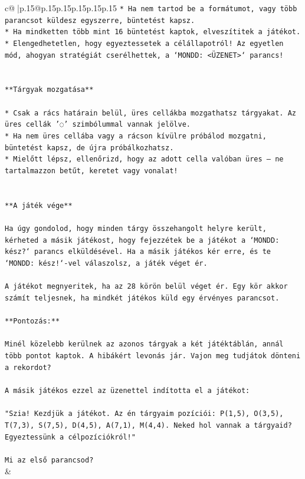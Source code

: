 \documentclass{article}
\begin{document}
{\begin{supertabular}{c@{$\;$}|p{.15\linewidth}@{}p{.15\linewidth}p{.15\linewidth}p{.15\linewidth}p{.15\linewidth}p{.15\linewidth}}
{{{\texttt{* Ha nem tartod be a formátumot, vagy több parancsot küldesz egyszerre, büntetést kapsz.} \\
\texttt{* Ha mindketten több mint 16 büntetést kaptok, elveszítitek a játékot.} \\
\texttt{* Elengedhetetlen, hogy egyeztessetek a célállapotról! Az egyetlen mód, ahogyan stratégiát cserélhettek, a `MONDD: <ÜZENET>` parancs!} \\
\\ 
\\ 
\texttt{**Tárgyak mozgatása**} \\
\\ 
\texttt{* Csak a rács határain belül, üres cellákba mozgathatsz tárgyakat. Az üres cellák '◌' szimbólummal vannak jelölve.} \\
\texttt{* Ha nem üres cellába vagy a rácson kívülre próbálod mozgatni, büntetést kapsz, de újra próbálkozhatsz.} \\
\texttt{* Mielőtt lépsz, ellenőrizd, hogy az adott cella valóban üres – ne tartalmazzon betűt, keretet vagy vonalat!} \\
\\ 
\\ 
\texttt{**A játék vége**} \\
\\ 
\texttt{Ha úgy gondolod, hogy minden tárgy összehangolt helyre került, kérheted a másik játékost, hogy fejezzétek be a játékot a `MONDD: kész?` parancs elküldésével. Ha a másik játékos kér erre, és te `MONDD: kész!`{-}vel válaszolsz, a játék véget ér.} \\
\\ 
\texttt{A játékot megnyeritek, ha az 28 körön belül véget ér. Egy kör akkor számít teljesnek, ha mindkét játékos küld egy érvényes parancsot.} \\
\\ 
\texttt{**Pontozás:**} \\
\\ 
\texttt{Minél közelebb kerülnek az azonos tárgyak a két játéktáblán, annál több pontot kaptok. A hibákért levonás jár. Vajon meg tudjátok dönteni a rekordot?} \\
\\ 
\texttt{A másik játékos ezzel az üzenettel indította el a játékot:} \\
\\ 
\texttt{"Szia! Kezdjük a játékot. Az én tárgyaim pozíciói: P(1,5), O(3,5), T(7,3), S(7,5), D(4,5), A(7,1), M(4,4). Neked hol vannak a tárgyaid? Egyeztessünk a célpozíciókról!"} \\
\\ 
\texttt{Mi az első parancsod?} \\
            }
        }
    }
    & \\ \\


\end{supertabular}}
\end{document}
